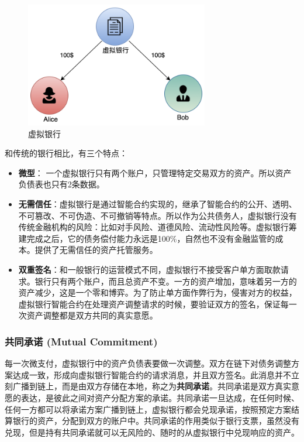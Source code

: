 \begin{figure}[h!]
    \centering
    \includegraphics[width=8cm, keepaspectratio]{../images/channel.png}
    \caption{虚拟银行}
    \label{fig:virtualbank}
\end{figure}

和传统的银行相比，有三个特点：

\begin{itemize}
\item  \textbf{微型}： 一个虚拟银行只有两个账户，只管理特定交易双方的资产。所以资产负债表也只有2条数据。
\item  \textbf{无需信任}：虚拟银行是通过智能合约实现的，继承了智能合约的公开、透明、不可篡改、不可伪造、不可撤销等特点。所以作为公共债务人，虚拟银行没有传统金融机构的风险：比如对手风险、道德风险、流动性风险等。虚拟银行筹建完成之后，它的债务偿付能力永远是100\%，自然也不没有金融监管的成本。提供了无需信任的资产托管服务。
\item  \textbf{双重签名}：和一般银行的运营模式不同，虚拟银行不接受客户单方面取款请求。银行只有两个账户，而且总资产不变。一方的资产增加，意味着另一方的资产减少，这是一个零和博弈。为了防止单方面作弊行为，侵害对方的权益，虚拟银行智能合约在处理资产调整请求的时候，要验证双方的签名，保证每一次资产调整都是双方共同的真实意愿。
\end{itemize}


\subsubsection{共同承诺 (Mutual Commitment)}
每一次微支付，虚拟银行中的资产负债表要做一次调整。双方在链下对债务调整方案达成一致，形成向虚拟银行智能合约的请求消息，并且双方签名。此消息并不立刻广播到链上，而是由双方存储在本地，称之为\textbf{共同承诺}。共同承诺是双方真实意愿的表达，是彼此之间对资产分配方案的承诺。共同承诺一旦达成，在任何时候、任何一方都可以将承诺方案广播到链上，虚拟银行都会兑现承诺，按照预定方案结算银行的资产，分配到双方的账户中。共同承诺的作用类似于银行支票，虽然没有兑现，但是持有共同承诺就可以无风险的、随时的从虚拟银行中兑现响应的资产。

